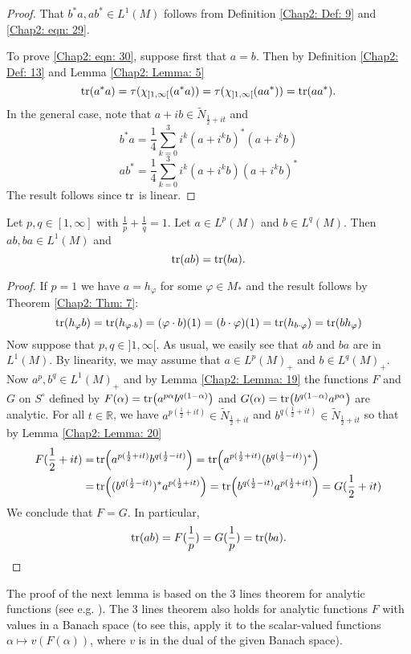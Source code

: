 \begin{proof}
    That $b^*a, ab^*\in L^1(M)$ follows from Definition \ref{Chap2: Def: 9} and \eqref{Chap2: eqn: 29}.\par
    To prove \eqref{Chap2: eqn: 30}, suppose first that $a=b$. Then by Definition \ref{Chap2: Def: 13} and Lemma \ref{Chap2: Lemma: 5}
    \[
        \tr(a^*a)=\tau(\chi_{]1,\infty[}(a^*a))=\tau(\chi_{]1,\infty[}(aa^*))=\tr(aa^*).
    \]
    In the general case, note that $a+ib\in \tilde{N}_{\frac{1}{2}+it}$ and
    \[
        b^*a=\frac{1}{4}\sum_{k=0}^3 i^k(a+i^kb)^*(a+i^kb)
    \]
    \[
        ab^*=\frac{1}{4}\sum_{k=0}^3 i^k(a+i^kb)(a+i^kb)^*
    \]
    The result follows since $\tr$ is linear.
\end{proof}
\begin{proposition}
    Let $p,q\in [1,\infty]$ with $\frac{1}{p}+\frac{1}{q}=1$. Let $a\in L^p(M)$ and $b\in L^q(M)$. Then $ab,ba\in L^1(M)$ and
    \[
        \tr(ab) = \tr(ba).
    \]
\end{proposition}
\begin{proof}
    If $p=1$ we have $a=h_\varphi$ for some $\varphi\in M_*$ and the result follows by Theorem \ref{Chap2: Thm: 7}:
    \[
        \tr(h_\varphi b)=\tr(h_{\varphi\cdot b})=(\varphi\cdot b)(1)=(b\cdot \varphi)(1)=\tr(h_{b\cdot\varphi})=\tr(bh_\varphi)
    \]
    Now suppose that $p,q\in ]1,\infty[$. As usual, we easily see that $ab$ and $ba$ are in $L^1(M)$. By linearity, we may assume that $a\in L^p(M)_+$ and $b\in L^q(M)_+$. Now $a^p,b^q\in L^1(M)_+$ and by Lemma \ref{Chap2: Lemma: 19} the functions $F$ and $G$ on $S^\circ$ defined by $F(\alpha)=\tr(a^{p\alpha}b^{q(1-\alpha)})$ and $G(\alpha)=\tr(b^{q(1-\alpha)}a^{p\alpha})$ are analytic. For all $t\in \mathbb{R}$, we have $a^{p(\frac{1}{2}+it)}\in\tilde{N}_{\frac{1}{2}+it}$ and $b^{q(\frac{1}{2}+it)}\in \tilde{N}_{\frac{1}{2}+it}$ so that by Lemma \ref{Chap2: Lemma: 20}
    \[
        \begin{split}
            F(\frac{1}{2}+it)=&\tr(a^{p(\frac{1}{2}+it)}b^{q(\frac{1}{2}-it)})=\tr(a^{p(\frac{1}{2}+it)}(b^{q(\frac{1}{2}-it)})^*)\\
            =&\tr((b^{q(\frac{1}{2}-it)})^*a^{p(\frac{1}{2}+it)})=\tr(b^{q(\frac{1}{2}-it)}a^{p(\frac{1}{2}+it)})=G(\frac{1}{2}+it)
        \end{split}
    \]
    We conclude that $F=G$. In particular,
    \[
        \tr(ab)=F(\frac{1}{p})=G(\frac{1}{p})=\tr(ba).
    \]
\end{proof}
The proof of the next lemma is based on the 3 lines theorem for analytic functions (see e.g. \cite[p.93]{23}). The 3 lines theorem also holds for analytic functions $F$ with values in a Banach space (to see this, apply it to the scalar-valued functions $\alpha\mapsto v(F(\alpha))$, where $v$ is in the dual of the given Banach space).
